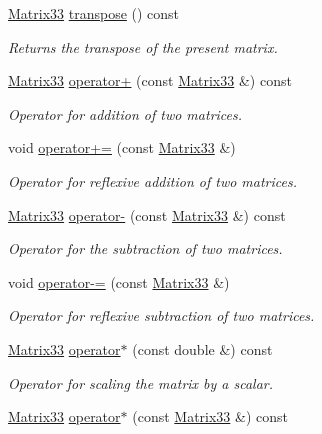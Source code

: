 \begin{DoxyCompactItemize}
\hyperlink{classMatrix33}{\-Matrix33} \hyperlink{classMatrix33_a64418c1a8836b38526fdfd7ffcc79cfd}{transpose} () const 
\begin{DoxyCompactList}\small\item\em \-Returns the transpose of the present matrix. \end{DoxyCompactList}\item 
\hyperlink{classMatrix33}{\-Matrix33} \hyperlink{classMatrix33_adc58ec5739c9250ff1150c725d0e868e}{operator+} (const \hyperlink{classMatrix33}{\-Matrix33} \&) const 
\begin{DoxyCompactList}\small\item\em \-Operator for addition of two matrices. \end{DoxyCompactList}\item 
void \hyperlink{classMatrix33_acb59e59d3937e075521f478ba83b7165}{operator+=} (const \hyperlink{classMatrix33}{\-Matrix33} \&)
\begin{DoxyCompactList}\small\item\em \-Operator for reflexive addition of two matrices. \end{DoxyCompactList}\item 
\hyperlink{classMatrix33}{\-Matrix33} \hyperlink{classMatrix33_a372f71ec208bb6d3045acd4324b7cb06}{operator-\/} (const \hyperlink{classMatrix33}{\-Matrix33} \&) const 
\begin{DoxyCompactList}\small\item\em \-Operator for the subtraction of two matrices. \end{DoxyCompactList}\item 
void \hyperlink{classMatrix33_abc889e10a9c7c532195c7031c1344a74}{operator-\/=} (const \hyperlink{classMatrix33}{\-Matrix33} \&)
\begin{DoxyCompactList}\small\item\em \-Operator for reflexive subtraction of two matrices. \end{DoxyCompactList}\item 
\hyperlink{classMatrix33}{\-Matrix33} \hyperlink{classMatrix33_a6992fd2bb0b6e9ad71b5d3481c4e3e1a}{operator$\ast$} (const double \&) const 
\begin{DoxyCompactList}\small\item\em \-Operator for scaling the matrix by a scalar. \end{DoxyCompactList}\item 
\hyperlink{classMatrix33}{\-Matrix33} \hyperlink{classMatrix33_a525f14614255ff81c0cbab8060e8e065}{operator$\ast$} (const \hyperlink{classMatrix33}{\-Matrix33} \&) const 

\end{DoxyCompactItemize}
